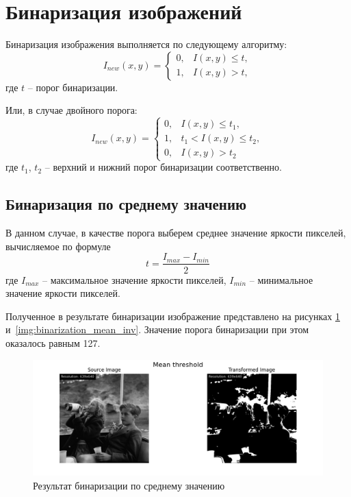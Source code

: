 \section{Бинаризация изображений}

Бинаризация изображения выполняется по следующему алгоритму:
\begin{equation}
    I_{new}(x, y) = \begin{cases}
        0, & I(x, y) \le t,\\
        1, & I(x, y) > t,
    \end{cases}
\end{equation}
где $t$ -- порог бинаризации. 

Или, в случае двойного порога: 
\begin{equation}
    I_{new}(x, y) = \begin{cases}
        0, & I(x, y) \le t_1,\\
        1, & t_1 < I(x, y) \le t_2, \\
        0, & I(x, y) > t_2
     \end{cases}
\end{equation}
где $t_1$, $t_2$ -- верхний и нижний порог бинаризации соответственно. 


\FloatBarrier
\subsection{Бинаризация по среднему значению}
В данном случае, в качестве порога выберем среднее значение яркости пикселей, вычисляемое по формуле
\begin{equation}
    t = \frac{I_{max} - I_{min}}{2}
\end{equation}
где $I_{max}$ -- максимальное значение яркости пикселей, $I_{min}$ -- минимальное значение яркости пикселей.

Полученное в результате бинаризации изображение представлено на рисунках \ref{img:binarization_mean} и~\ref{img:binarization_mean_inv}. Значение порога бинаризации при этом оказалось равным 127.
\begin{figure}[ht!]
    \centering
    \includegraphics[width=\textwidth]{../results/Mean threshold.png}
    \caption{Результат бинаризации по среднему значению}
    \label{img:binarization_mean}
\end{figure}

